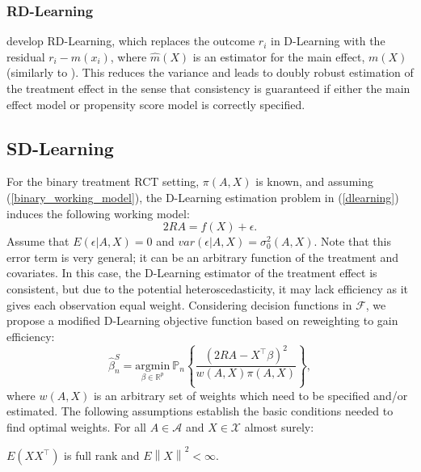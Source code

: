 \documentclass[useAMS,usenatbib]{biom}
\begin{document}
\subsubsection{RD-Learning} \label{subsubsec_rdlearn}

\cite{meng_doubly_2021} develop RD-Learning, which replaces the outcome $r_i$ in D-Learning with the residual $r_i - \hat{m}(x_i)$, where $\hat{m}(X)$ is an estimator for the main effect, $m(X)$ (similarly to \cite{zhou_residual_2017}). This reduces the variance and leads to doubly robust estimation of the treatment effect in the sense that consistency is guaranteed if either the main effect model or propensity score model is correctly specified.

\subsection{SD-Learning} \label{subsec_sdlearn}

For the binary treatment RCT setting, $\pi(A,X)$ is known, and assuming (\ref{binary_working_model}), the D-Learning estimation problem in (\ref{dlearning}) induces the following working model:
\begin{equation*}
2RA = f(X) + \epsilon.
\end{equation*}
Assume that $E(\epsilon|A,X) = 0$ and $var(\epsilon|A,X) = \sigma_0^2(A,X)$. Note that this error term is very general; it can be an arbitrary function of the treatment and covariates. In this case, the D-Learning estimator of the treatment effect is consistent, but due to the potential heteroscedasticity, it may lack efficiency as it gives each observation equal weight. Considering decision functions in $\mathcal{F}$, we propose a modified D-Learning objective function based on reweighting to gain efficiency:
\begin{equation} \label{sd_objective_binary}
\hat{\beta}_n^S = \underset{\beta \in \mathbb{R}^{p}}{\mathrm{argmin}}\ \mathbb{P}_n \left\{ \frac{(2RA - X^{\top}\beta)^2}{w(A,X) \pi(A,X)} \right\},
\end{equation}
where $w(A,X)$ is an arbitrary set of weights which need to be specified and/or estimated. The following assumptions establish the basic conditions needed to find optimal weights. For all $A \in \mathcal{A}$ and $X \in \mathcal{X}$ almost surely:

\begin{assumption} \label{full_rank}
$E(XX^{\top})$ is full rank and $E \left\| X \right\|^2 < \infty$.
\end{assumption}
\end{document}
